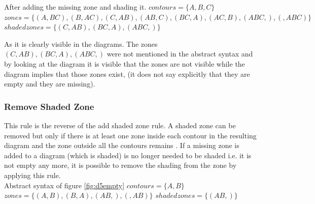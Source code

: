\documentclass[a4paper]{article}
\begin{document}
After adding the missing zone and shading it.\newline
$contours =  \lbrace A, B, C \rbrace $ \newline
$zones = \lbrace (A , BC) , (B , AC), (C, AB), (AB , C) , (BC , A) , (AC, B), (ABC , ), (  , ABC) \rbrace  $ \newline 
$shaded zones = \lbrace (C, AB), (BC , A), (ABC , ) \rbrace  $ \newline

As it is clearly visible in the diagrams. The zones $(C, AB) , (BC, A), (ABC, )$ were not mentioned in the abstract syntax and by looking at the diagram it is visible that the zones are not visible while the diagram implies that those zones exist, (it does not say explicitly that they are empty and they are missing).

\subsubsection{Remove Shaded Zone}

This rule is the reverse of the add shaded zone rule. A shaded zone can be removed but only if there is at least one zone inside each contour in the resulting diagram and the zone outside all the contours remains \cite{Fish_2007}. If a missing zone is added to a diagram (which is shaded) is no longer needed to be shaded i.e. it is not empty any more, it is possible to remove the shading from the zone by applying this rule. 
\\

Abstract syntax of figure \ref{fig:d5empty}\newline
$contours =  \lbrace A, B \rbrace $ \newline
$zones = \lbrace (A , B) , (B , A), (AB , ) , ( , AB) \rbrace  $ \newline 
$shaded zones = \lbrace (AB , ) \rbrace  $ \newline
\end{document}
